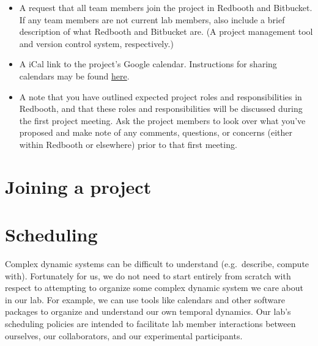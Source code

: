 \documentclass{tufte-book} %
\begin{document}
\begin{enumerate}
\begin{itemize}
{    Poll} proposing some times for a first team meeting.
\item A request that all team members join the project in Redbooth and
  Bitbucket.  If any team members are not current lab members, also
  include a brief description of what Redbooth and Bitbucket are.  (A
  project management tool and version control system, respectively.)
\item A iCal link to the project's Google calendar.  Instructions for
  sharing calendars may be found \href{https://support.google.com/calendar/answer/37082?hl=en}{here}.
\item A note that you have outlined expected project roles and
  responsibilities in Redbooth, and that these roles and
  responsibilities will be discussed during the first project
  meeting.  Ask the project members to look over what you've proposed
  and make note of any comments, questions, or concerns (either within
  Redbooth or elsewhere) prior to that first meeting.
\end{itemize}
\end{enumerate}

\newpage
\section{Joining a project}





%  


\newpage
\section{Scheduling}
Complex dynamic systems can be difficult to understand (e.g.\
describe, compute with).  Fortunately for us, we do not need to start
entirely from scratch with respect to attempting to organize some
complex dynamic system we care about in our lab.  For example, we can
use tools like calendars and other software packages to organize and
understand our own temporal dynamics.  Our lab's scheduling policies
are intended to facilitate lab member interactions between ourselves,
our collaborators, and our experimental participants.
\end{document}
